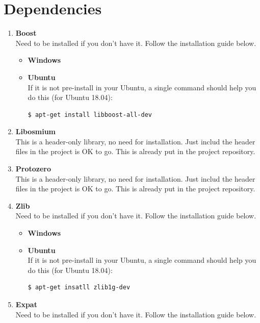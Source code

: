 \documentclass[a4paper, 12pt, english]{book}
\begin{document}
\section{Dependencies}

\begin{enumerate}
	\item {\textbf{Boost}}\\
	Need to be installed if you don't have it. Follow the installation guide below.
		\begin{itemize}[noitemsep]
		\item {\textbf{Windows}} \\
		\item {\textbf{Ubuntu}} \\
		If it is not pre-install in your Ubuntu, a single command 
		should help you do this (for Ubuntu 18.04):
		\begin{lstlisting}[language=bash]
$ apt-get install libboost-all-dev
		\end{lstlisting}
		\end{itemize}
	\item {\textbf{Libosmium}} \\
		This is a header-only library, no need for installation. 
		Just includ the header files in the project is OK to go.
		This is already put in the project repository.
	\item {\textbf{Protozero}} \\
		This is a header-only library, no need for installation. 
		Just includ the header files in the project is OK to go.
		This is already put in the project repository.
	\item {\textbf{Zlib}} \\
	Need to be installed if you don't have it. Follow the installation guide below.
		\begin{itemize}[noitemsep]
		\item {\textbf{Windows}} \\
		\item {\textbf{Ubuntu}} \\
		If it is not pre-install in your Ubuntu, a single command 
		should help you do this (for Ubuntu 18.04):
		\begin{lstlisting}[language=bash]
$ apt-get insatll zlib1g-dev
		\end{lstlisting}
		\end{itemize}
	\item {\textbf{Expat}}\\
	Need to be installed if you don't have it. Follow the installation guide below.

\end{enumerate}
\end{document}
